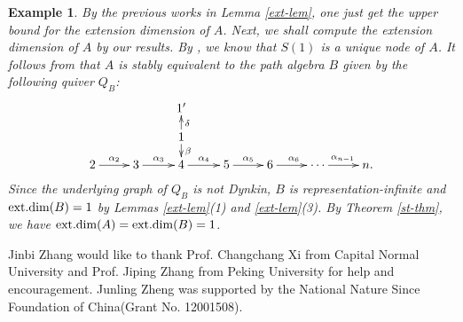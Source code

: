 \documentclass[12pt]{article}
\numberwithin{equation}{section}
\newtheorem{Bsp}[Def]{Example}%
\theoremstyle{definition}
\def\ed{\mathop{\rm ext.dim}\nolimits}
\begin{document}
\begin{Bsp}
{By the previous works in Lemma \ref{ext-lem}, one just get the upper bound for the extension dimension of $A$. Next, we shall compute the extension dimension of $A$ by our results. By \cite[Lemma 1]{MV1980}, we know that $S(1)$ is a unique node of $A$. It follows from \cite[Theorem 2.10]{MV1980} that $A$ is stably equivalent to the path algebra $B$ given by the following quiver $Q_B$:
$$\xymatrix@R=10pt{
&&1'&&&&\\
&&1\ar[d]^{\beta}\ar[u]_{\delta}&&&&\\
2\ar[r]^{\alpha_2}
&3\ar[r]^{\alpha_3}
&4\ar[r]^{\alpha_4}
&5\ar[r]^{\alpha_5}
&6\ar[r]^{\alpha_6}
&\cdots \ar[r]^{\alpha_{n-1}}
&n.}$$
Since the underlying graph of $Q_B$ is not Dynkin, $B$ is representation-infinite and $\ed(B)=1$ by Lemmas \ref{ext-lem}(1) and \ref{ext-lem}(3). By Theorem \ref{st-thm}, we have $\ed(A)=\ed(B)=1$.
}\end{Bsp}

\bigskip
{}
Jinbi Zhang would like to thank Prof. Changchang Xi from Capital Normal University and Prof. Jiping Zhang from Peking University for help and encouragement. Junling Zheng was supported by the National Nature Since Foundation of China(Grant No. 12001508).
\end{document}
